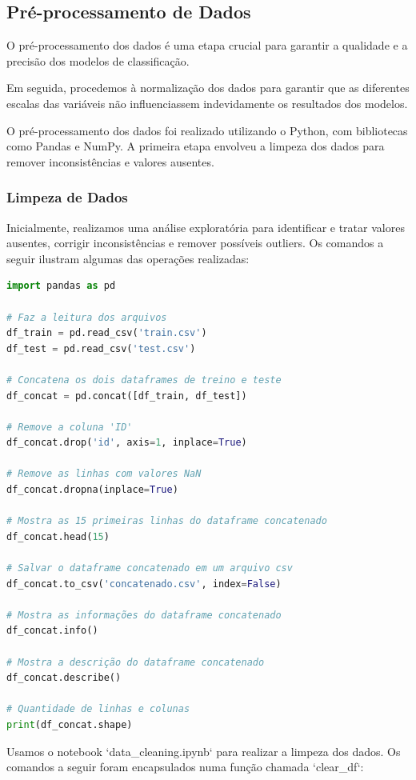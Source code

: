 \documentclass[conference]{IEEEtran}
\begin{document}
\subsection{Pré-processamento de Dados}
O pré-processamento dos dados é uma etapa crucial para garantir a qualidade 
e a precisão dos modelos de classificação. 

Em seguida, procedemos à normalização dos dados para garantir que as diferentes 
escalas das variáveis não influenciassem indevidamente os resultados dos modelos.

O pré-processamento dos dados foi realizado utilizando o Python, 
com bibliotecas como Pandas e NumPy. 
A primeira etapa envolveu a limpeza dos dados para remover inconsistências 
e valores ausentes.

\subsubsection{Limpeza de Dados}
Inicialmente, realizamos uma análise exploratória para identificar 
e tratar valores ausentes, 
corrigir inconsistências e remover possíveis outliers. 
Os comandos a seguir ilustram algumas das operações realizadas:

\begin{lstlisting}[language=Python]
import pandas as pd

# Faz a leitura dos arquivos
df_train = pd.read_csv('train.csv')
df_test = pd.read_csv('test.csv')

# Concatena os dois dataframes de treino e teste
df_concat = pd.concat([df_train, df_test])

# Remove a coluna 'ID' 
df_concat.drop('id', axis=1, inplace=True)

# Remove as linhas com valores NaN
df_concat.dropna(inplace=True)

# Mostra as 15 primeiras linhas do dataframe concatenado
df_concat.head(15) 

# Salvar o dataframe concatenado em um arquivo csv
df_concat.to_csv('concatenado.csv', index=False)

# Mostra as informações do dataframe concatenado
df_concat.info()

# Mostra a descrição do dataframe concatenado
df_concat.describe()

# Quantidade de linhas e colunas
print(df_concat.shape)
\end{lstlisting}

Usamos o notebook `data\_cleaning.ipynb` para realizar a limpeza dos dados. 
Os comandos a seguir foram encapsulados numa função chamada `clear\_df`:
\end{document}
